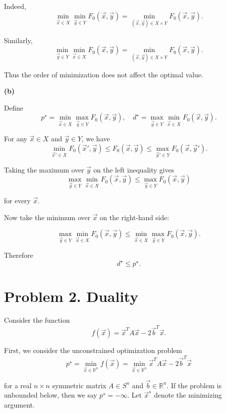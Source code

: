 \documentclass[
	12pt,
]{fphw}
\begin{document}
Indeed,
\[
\min_{\vec{x}\in X}\min_{\vec{y}\in Y} F_0(\vec{x},\vec{y})
=
\min_{(\vec{x},\vec{y})\in X\times Y} F_0(\vec{x},\vec{y}).
\]

Similarly,
\[
\min_{\vec{y}\in Y}\min_{\vec{x}\in X} F_0(\vec{x},\vec{y})
=
\min_{(\vec{x},\vec{y})\in X\times Y} F_0(\vec{x},\vec{y}).
\]

Thus the order of minimization does not affect the optimal value.

\bigskip

\textbf{(b)}

Define
\[
p^\star = \min_{\vec{x}\in X}\max_{\vec{y}\in Y} F_0(\vec{x},\vec{y}),
\quad
d^\star = \max_{\vec{y}\in Y}\min_{\vec{x}\in X} F_0(\vec{x},\vec{y}).
\]

For any $\vec{x}\in X$ and $\vec{y}\in Y$, we have
\[
\min_{\vec{x}'\in X} F_0(\vec{x}',\vec{y}) \le F_0(\vec{x},\vec{y})
\le \max_{\vec{y}'\in Y} F_0(\vec{x},\vec{y}').
\]

Taking the maximum over $\vec{y}$ on the left inequality gives
\[
\max_{\vec{y}\in Y} \min_{\vec{x}\in X} F_0(\vec{x},\vec{y})
\le
\max_{\vec{y}\in Y} F_0(\vec{x},\vec{y})
\]

for every $\vec{x}$.

Now take the minimum over $\vec{x}$ on the right-hand side:

\[
\max_{\vec{y}\in Y} \min_{\vec{x}\in X} F_0(\vec{x},\vec{y})
\le
\min_{\vec{x}\in X} \max_{\vec{y}\in Y} F_0(\vec{x},\vec{y}).
\]

Therefore
\[
d^\star \le p^\star.
\]


\newpage
\section*{Problem 2. Duality}


Consider the function
\[
f(\vec{x}) = \vec{x}^T A \vec{x} - 2\vec{b}^T \vec{x}.
\]

First, we consider the unconstrained optimization problem
\[
p^\star = \min_{\vec{x}\in\mathbb{R}^n} f(\vec{x})
= \min_{\vec{x}\in\mathbb{R}^n} \vec{x}^T A \vec{x} - 2\vec{b}^T \vec{x}
\]

for a real $n\times n$ symmetric matrix $A\in S^n$ and $\vec{b}\in\mathbb{R}^n$.  
If the problem is unbounded below, then we say $p^\star = -\infty$.  
Let $\vec{x}^\star$ denote the minimizing argument.
\end{document}
